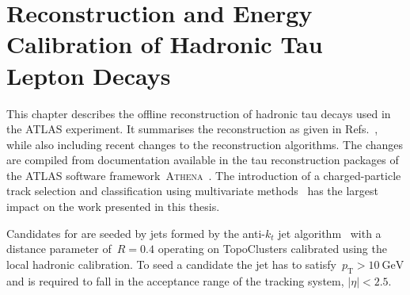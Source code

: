 \chapter{Reconstruction and Energy Calibration of Hadronic Tau Lepton Decays}
\label{sec:reconstruction}

%
%
This chapter describes the offline reconstruction of hadronic tau decays used in
the ATLAS experiment. It summarises the reconstruction as given in Refs.\
\cite{atlas:taurec:run1, atlas:taurec:run2}, while also including recent changes
to the reconstruction algorithms. The changes are compiled from documentation
available in the tau reconstruction packages of the ATLAS software
framework~\textsc{Athena}~\cite{athena}. The introduction of a charged-particle
track selection and classification using multivariate methods~\cite{duschinger}
has the largest impact on the work presented in this thesis.

Candidates for \tauhadvis are seeded by jets formed by the anti-$k_t$ jet
algorithm~\cite{antikt} with a distance parameter of~$R = 0.4$ operating on
TopoClusters calibrated using the local hadronic calibration. To seed a
\tauhadvis candidate the jet has to satisfy~$p_\text{T} > \SI{10}{\GeV}$ and is
required to fall in the acceptance range of the tracking
system, $|\eta| < \num{2.5}$.


